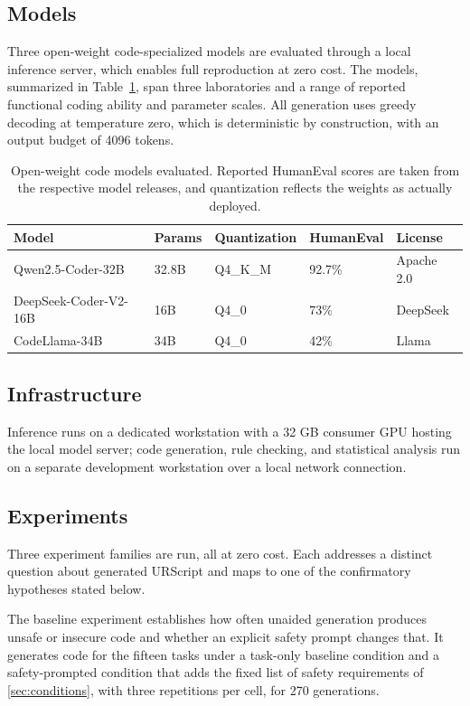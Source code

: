 \documentclass{ieeeaccess}
\begin{document}
\subsection{Models}\label{sec:models}
Three open-weight code-specialized models are evaluated through a local inference
server, which enables full reproduction at zero cost. The models, summarized in
Table~\ref{tab:models}, span three laboratories and a range of reported functional
coding ability and parameter scales. All generation uses greedy decoding at
temperature zero, which is deterministic by construction, with an output budget of
4096 tokens.

\begin{table}[h]
\caption{Open-weight code models evaluated. Reported HumanEval scores are taken from
the respective model releases, and quantization reflects the weights as actually
deployed.}
\label{tab:models}
\centering
\footnotesize
\setlength{\tabcolsep}{2.5pt}
\begin{tabular}{@{}lllll@{}}
\toprule
Model & Params & Quantization & HumanEval & License \\
\midrule
Qwen2.5-Coder-32B & 32.8B & Q4\_K\_M & 92.7\% & Apache 2.0 \\
DeepSeek-Coder-V2-16B & 16B & Q4\_0 & 73\% & DeepSeek \\
CodeLlama-34B & 34B & Q4\_0 & 42\% & Llama \\
\bottomrule
\end{tabular}
\end{table}

\subsection{Infrastructure}\label{sec:infra}
Inference runs on a dedicated workstation with a 32 GB consumer GPU hosting the local
model server; code generation, rule checking, and statistical analysis run on a
separate development workstation over a local network connection.

\subsection{Experiments}\label{sec:exps}

Three experiment families are run, all at zero cost. Each addresses a distinct
question about generated URScript and maps to one of the confirmatory hypotheses
stated below.

The baseline experiment establishes how often unaided generation produces unsafe or
insecure code and whether an explicit safety prompt changes that. It generates code
for the fifteen tasks under a task-only baseline condition and a safety-prompted
condition that adds the fixed list of safety requirements of \ref{sec:conditions}, with
three repetitions per cell, for 270 generations.
\end{document}
